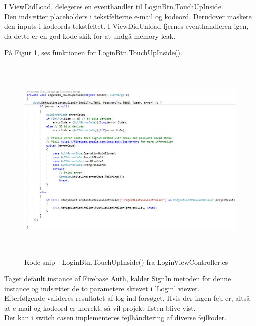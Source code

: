 \clearpage

I ViewDidLoad, delegeres en eventhandler\cite{Event} til LoginBtn.TouchUpInside. \\
Den indsætter placeholders i tekstfelterne e-mail og kodeord. Derudover maskere den inputs i kodeords tekstfeltet.
I ViewDidUnload fjernes eventhandleren igen, da dette er en god kode skik for at undgå memory leak\cite{Memory}.

På Figur \ref{fig:LoginBtn}, ses funktionen for LoginBtn.TouchUpInside().
\begin{figure}[H] %
	\centering
	\includegraphics[height=10cm, width=18cm]{../ArkitekturDesign/Design/Login/LoginBtn}
	\caption{Kode snip - LoginBtn.TouchUpInside() fra LoginViewController.cs}
	\label{fig:LoginBtn}
\end{figure}
Tager default instance af Firebase Auth, kalder SignIn metoden for denne instance og indsætter de to parametere skrevet i 'Login' viewet. \\
Efterfølgende valideres resultatet af log ind forsøget. Hvis der ingen fejl er, altså at e-mail og kodeord er korrekt, så vil projekt listen blive vist. \\
Der kan i switch casen implementeres fejlhåndtering af diverse fejlkoder. 


\clearpage